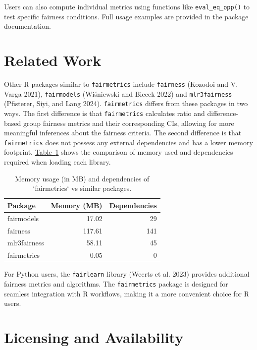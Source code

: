 \documentclass[10pt,a4paper,onecolumn]{article}
\begin{document}
Users can also compute individual metrics using functions like
\texttt{eval\_eq\_opp()} to test specific fairness conditions. Full
usage examples are provided in the package documentation.

\section{Related Work}\label{related-work}

Other R packages similar to \texttt{fairmetrics} include
\texttt{fairness} (Kozodoi and V. Varga 2021), \texttt{fairmodels}
(Wiśniewski and Biecek 2022) and \texttt{mlr3fairness} (Pfisterer, Siyi,
and Lang 2024). \texttt{fairmetrics} differs from these packages in two
ways. The first difference is that \texttt{fairmetrics} calculates ratio
and difference-based group fairness metrics and their corresponding CIs,
allowing for more meaningful inferences about the fairness criteria. The
second difference is that \texttt{fairmetrics} does not possess any
external dependencies and has a lower memory footprint.
\hyperref[tab:memory_dep_usage]{Table~\ref*{tab:memory_dep_usage}} shows
the comparison of memory used and dependencies required when loading
each library.

\begin{table}[ht]
\centering
\begin{tabular}{l r r}
\hline
\textbf{Package} & \textbf{Memory (MB)} & \textbf{Dependencies} \\
\hline
fairmodels  & 17.02  & 29 \\
fairness    & 117.61 & 141\\
mlr3fairness & 58.11  & 45 \\
fairmetrics & 0.05   & 0  \\
\hline
\end{tabular}
\caption{Memory usage (in MB) and dependencies of `fairmetrics` vs similar packages.}
\label{tab:memory_dep_usage}
\end{table}

For Python users, the \texttt{fairlearn} library (Weerts et al. 2023)
provides additional fairness metrics and algorithms. The
\texttt{fairmetrics} package is designed for seamless integration with R
workflows, making it a more convenient choice for R users.

\section{Licensing and Availability}\label{licensing-and-availability}
\end{document}
